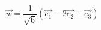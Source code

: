 \begin{displaymath}
 \overrightarrow{w}=\frac{1}{\sqrt{6}}(\overrightarrow{e_1} - 2\overrightarrow{e_2}+\overrightarrow{e_3})
\end{displaymath}

